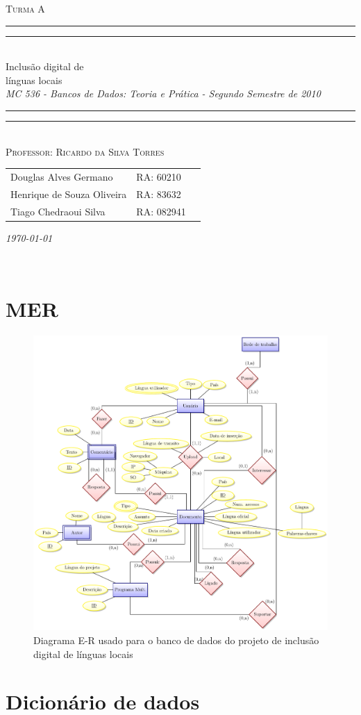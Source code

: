 \documentclass[letter]{article}
\newcommand*{\titleTMB}{\begingroup \centering \settowidth{\unitlength}{\LARGE MC 536} \vspace*{\baselineskip} {\large\scshape  Turma A}\\[\baselineskip] \rule{11.0cm}{1.6pt}\vspace*{-\baselineskip}\vspace*{2pt} \rule{11.0cm}{0.4pt}\\[\baselineskip] {\LARGE  Inclusão digital de  }\\[0.2\baselineskip] {\LARGE línguas locais   }\\[0.2\baselineskip] {\itshape MC 536 - Bancos de Dados: Teoria e Prática - Segundo Semestre de 2010}\\[0.2\baselineskip] \rule{11.0cm}{0.4pt}\vspace*{-\baselineskip}\vspace{3.2pt} \rule{11.0cm}{1.6pt}\\[\baselineskip] {\large\scshape Professor: 
Ricardo da Silva Torres}\par \vfill {\normalsize   \scshape 
    \begin{center} 
      \begin{tabular}{  l  l  p{5cm} } 
        Douglas Alves Germano & RA: 60210\\
        Henrique de Souza Oliveira & RA: 83632\\
        Tiago Chedraoui Silva  & RA: 082941\\
      \end{tabular} \end{center}
    \itshape \today }\\[\baselineskip] \vspace{3.2pt} \endgroup}
\begin{document}
\titleTMB 
\newpage

\tableofcontents 
\listoffigures

\newpage
\section{MER}
\begin{figure}[h!]
\includegraphics[scale=0.9,angle=90]{mer}
\caption{Diagrama E-R usado para o banco de dados do projeto de inclusão digital de línguas locais}
\end{figure}

\newpage
\section{Dicionário de dados}

\end{document}
